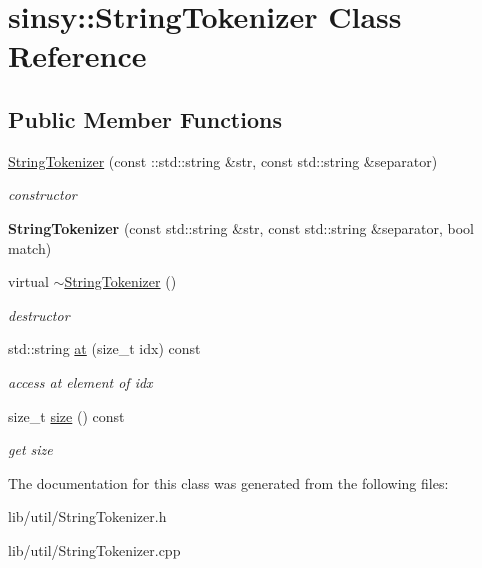 \hypertarget{classsinsy_1_1StringTokenizer}{\section{sinsy\-:\-:\-String\-Tokenizer \-Class \-Reference}
\label{classsinsy_1_1StringTokenizer}
}
\subsection*{\-Public \-Member \-Functions}
\begin{DoxyCompactItemize}
\item 
\hypertarget{classsinsy_1_1StringTokenizer_a9e7a76b341939bc5b97daa75134da1ff}{\hyperlink{classsinsy_1_1StringTokenizer_a9e7a76b341939bc5b97daa75134da1ff}{\-String\-Tokenizer} (const \-::std\-::string \&str, const std\-::string \&separator)}\label{classsinsy_1_1StringTokenizer_a9e7a76b341939bc5b97daa75134da1ff}

\begin{DoxyCompactList}\small\item\em constructor \end{DoxyCompactList}\item 
\hypertarget{classsinsy_1_1StringTokenizer_a74f663e102f0d731990494c0d7fd8803}{{\bfseries \-String\-Tokenizer} (const std\-::string \&str, const std\-::string \&separator, bool match)}\label{classsinsy_1_1StringTokenizer_a74f663e102f0d731990494c0d7fd8803}

\item 
\hypertarget{classsinsy_1_1StringTokenizer_a26a59cd69f871ace17ec831e1508b377}{virtual \hyperlink{classsinsy_1_1StringTokenizer_a26a59cd69f871ace17ec831e1508b377}{$\sim$\-String\-Tokenizer} ()}\label{classsinsy_1_1StringTokenizer_a26a59cd69f871ace17ec831e1508b377}

\begin{DoxyCompactList}\small\item\em destructor \end{DoxyCompactList}\item 
\hypertarget{classsinsy_1_1StringTokenizer_a85bda635b73d7321e769f935c8ceb2e0}{std\-::string \hyperlink{classsinsy_1_1StringTokenizer_a85bda635b73d7321e769f935c8ceb2e0}{at} (size\-\_\-t idx) const }\label{classsinsy_1_1StringTokenizer_a85bda635b73d7321e769f935c8ceb2e0}

\begin{DoxyCompactList}\small\item\em access at element of idx \end{DoxyCompactList}\item 
\hypertarget{classsinsy_1_1StringTokenizer_a920b9028afe112760e4c088a2c378c5f}{size\-\_\-t \hyperlink{classsinsy_1_1StringTokenizer_a920b9028afe112760e4c088a2c378c5f}{size} () const }\label{classsinsy_1_1StringTokenizer_a920b9028afe112760e4c088a2c378c5f}

\begin{DoxyCompactList}\small\item\em get size \end{DoxyCompactList}\end{DoxyCompactItemize}


\-The documentation for this class was generated from the following files\-:\begin{DoxyCompactItemize}
\item 
lib/util/\-String\-Tokenizer.\-h\item 
lib/util/\-String\-Tokenizer.\-cpp\end{DoxyCompactItemize}
